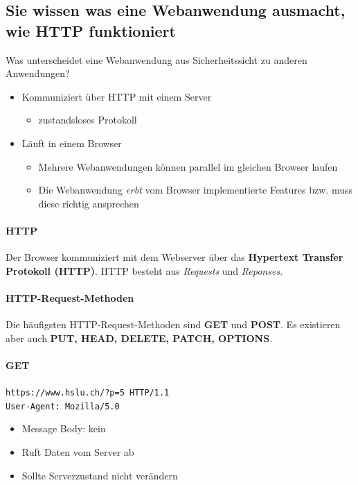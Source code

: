 \documentclass[10pt,a4paper]{article}
\begin{document}
\subsection*{Sie wissen was eine Webanwendung ausmacht, wie HTTP funktioniert}
Was unterscheidet eine Webanwendung aus Sicherheitssicht zu anderen Anwendungen?
\begin{itemize}[noitemsep,topsep=0pt,leftmargin=*]
    \item Kommuniziert über HTTP mit einem Server
    \begin{itemize}[noitemsep,topsep=0pt,leftmargin=*]
        \item zustandsloses Protokoll
    \end{itemize}
    \item Läuft in einem Browser
    \begin{itemize}[noitemsep,topsep=0pt,leftmargin=*]
        \item Mehrere Webanwendungen können parallel im gleichen Browser laufen
        \item Die Webanwendung \textsl{erbt} vom Browser implementierte Features
        bzw. muss diese richtig ansprechen
    \end{itemize}
\end{itemize}

\paragraph*{HTTP}Der Browser kommuniziert mit dem Webserver über das \textbf{Hypertext Transfer Protokoll (HTTP)}. HTTP besteht aus \textsl{Requests} und \textsl{Reponses}.

\paragraph*{HTTP-Request-Methoden}Die häufigsten HTTP-Request-Methoden sind \textbf{GET} und \textbf{POST}.
Es existieren aber auch \textbf{PUT, HEAD, DELETE, PATCH, OPTIONS}.

\paragraph*{GET}\texttt{https://www.hslu.ch/?p=5 HTTP/1.1\\User-Agent: Mozilla/5.0}
\begin{itemize}[noitemsep,topsep=0pt,leftmargin=*]
    \item Message Body: kein
    \item Ruft Daten vom Server ab
    \item Sollte Serverzustand nicht verändern
\end{itemize}
\end{document}
